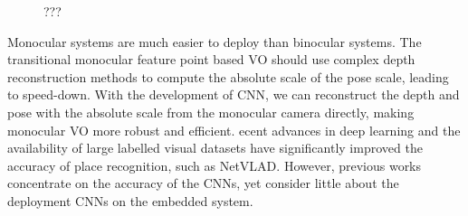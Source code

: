\begin{figure}[thb]
    \begin{minipage}[t]{0.5\linewidth}  
    \centering
    \end{minipage}
    \begin{minipage}[t]{0.5\linewidth}  
    \centering  
    \end{minipage}
    \caption{???
    }
\label{fig:overview}
\end{figure}

Monocular systems are much easier to deploy than binocular systems. The transitional monocular feature point based VO should use complex depth reconstruction methods to compute the absolute scale of the pose scale\cite{pizzoli2014remode}, leading to speed-down. With the development of CNN, we can reconstruct the depth and pose with the absolute scale from the monocular camera directly, making monocular VO more robust and efficient\cite{Zhan:2018e92}. ecent advances in deep learning and the availability of large labelled visual datasets have significantly improved the accuracy of place recognition, such as NetVLAD\cite{Arandjelovic:2017997}. However, previous works concentrate on the accuracy of the CNNs, yet consider little about the deployment CNNs on the embedded system.

